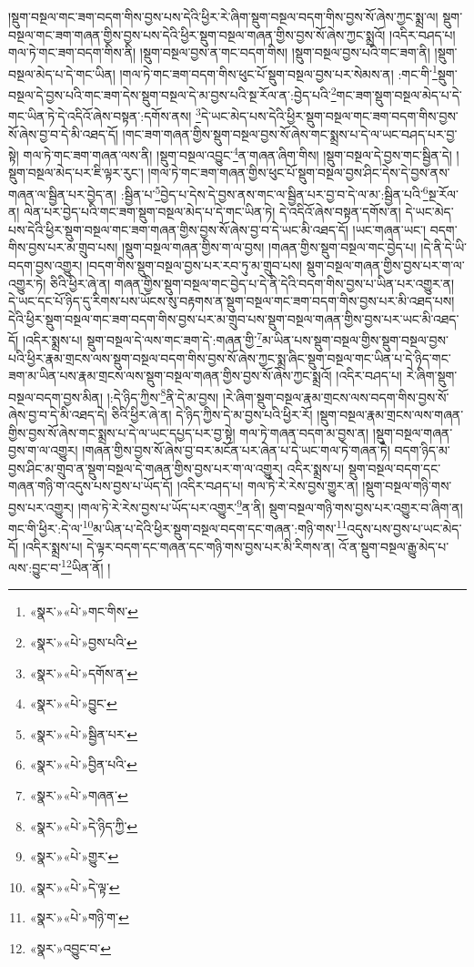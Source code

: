 །སྡུག་བསྔལ་གང་ཟག་བདག་གིས་བྱས་པས་དེའི་ཕྱིར་རེ་ཞིག་སྡུག་བསྔལ་བདག་གིས་བྱས་སོ་ཞེས་ཀྱང་སྨྲ་ལ། སྡུག་བསྔལ་གང་ཟག་གཞན་གྱིས་བྱས་པས་དེའི་ཕྱིར་སྡུག་བསྔལ་གཞན་གྱིས་བྱས་སོ་ཞེས་ཀྱང་སྨྲའོ། །འདིར་བཤད་པ། གལ་ཏེ་གང་ཟག་བདག་གིས་ནི། །སྡུག་བསྔལ་བྱས་ན་གང་བདག་གིས། །སྡུག་བསྔལ་བྱས་པའི་གང་ཟག་ནི། །སྡུག་བསྔལ་མེད་པ་དེ་གང་ཡིན། །གལ་ཏེ་གང་ཟག་བདག་གིས་ཕུང་པོ་སྡུག་བསྔལ་བྱས་པར་སེམས་ན། :གང་གི་\footnote{«སྣར་»«པེ་»གང་གིས་}སྡུག་བསྔལ་དེ་བྱས་པའི་གང་ཟག་དེས་སྡུག་བསྔལ་དེ་མ་བྱས་པའི་སྔ་རོལ་ན་:བྱེད་པའི་\footnote{«སྣར་»«པེ་»བྱས་པའི་}གང་ཟག་སྡུག་བསྔལ་མེད་པ་དེ་གང་ཡིན་ཏེ་དེ་འདིའོ་ཞེས་བསྟན་:དགོས་ནས། \footnote{«སྣར་»«པེ་»དགོས་ན་}དེ་ཡང་མེད་པས་དེའི་ཕྱིར་སྡུག་བསྔལ་གང་ཟག་བདག་གིས་བྱས་སོ་ཞེས་བྱ་བ་དེ་མི་འཐད་དོ། །གང་ཟག་གཞན་གྱིས་སྡུག་བསྔལ་བྱས་སོ་ཞེས་གང་སྨྲས་པ་དེ་ལ་ཡང་བཤད་པར་བྱ་སྟེ། གལ་ཏེ་གང་ཟག་གཞན་ལས་ནི། །སྡུག་བསྔལ་འབྱུང་\footnote{«སྣར་»«པེ་»བྱུང་}ན་གཞན་ཞིག་གིས། །སྡུག་བསྔལ་དེ་བྱས་གང་སྦྱིན་དེ། །སྡུག་བསྔལ་མེད་པར་ཇི་ལྟར་རུང་། །གལ་ཏེ་གང་ཟག་གཞན་གྱིས་ཕུང་པོ་སྡུག་བསྔལ་བྱས་ཤིང་དེས་དེ་བྱས་ནས་གཞན་ལ་སྦྱིན་པར་བྱེད་ན། :སྦྱིན་པ་\footnote{«སྣར་»«པེ་»སྦྱིན་པར་}བྱེད་པ་དེས་དེ་བྱས་ནས་གང་ལ་སྦྱིན་པར་བྱ་བ་དེ་ལ་མ་:སྦྱིན་པའི་\footnote{«སྣར་»«པེ་»བྱིན་པའི་}སྔ་རོལ་ན། ལེན་པར་བྱེད་པའི་གང་ཟག་སྡུག་བསྔལ་མེད་པ་དེ་གང་ཡིན་ཏེ། དེ་འདིའོ་ཞེས་བསྟན་དགོས་ན། དེ་ཡང་མེད་པས་དེའི་ཕྱིར་སྡུག་བསྔལ་གང་ཟག་གཞན་གྱིས་བྱས་སོ་ཞེས་བྱ་བ་དེ་ཡང་མི་འཐད་དོ། །ཡང་གཞན་ཡང་། བདག་གིས་བྱས་པར་མ་གྲུབ་པས། །སྡུག་བསྔལ་གཞན་གྱིས་ག་ལ་བྱས། །གཞན་གྱིས་སྡུག་བསྔལ་གང་བྱེད་པ། །དེ་ནི་དེ་ཡི་བདག་བྱས་འགྱུར། །བདག་གིས་སྡུག་བསྔལ་བྱས་པར་རབ་ཏུ་མ་གྲུབ་པས། སྡུག་བསྔལ་གཞན་གྱིས་བྱས་པར་ག་ལ་འགྱུར་ཏེ། ཅིའི་ཕྱིར་ཞེ་ན། གཞན་གྱིས་སྡུག་བསྔལ་གང་བྱེད་པ་དེ་ནི་དེའི་བདག་གིས་བྱས་པ་ཡིན་པར་འགྱུར་ན། དེ་ཡང་དང་པོ་ཉིད་དུ་རིགས་པས་ཡོངས་སུ་བརྟགས་ན་སྡུག་བསྔལ་གང་ཟག་བདག་གིས་བྱས་པར་མི་འཐད་པས། དེའི་ཕྱིར་སྡུག་བསྔལ་གང་ཟག་བདག་གིས་བྱས་པར་མ་གྲུབ་པས་སྡུག་བསྔལ་གཞན་གྱིས་བྱས་པར་ཡང་མི་འཐད་དོ། །འདིར་སྨྲས་པ། སྡུག་བསྔལ་དེ་ལས་གང་ཟག་དེ་:གཞན་གྱི་\footnote{«སྣར་»«པེ་»གཞན་}མ་ཡིན་པས་སྡུག་བསྔལ་གྱིས་སྡུག་བསྔལ་བྱས་པའི་ཕྱིར་རྣམ་གྲངས་ལས་སྡུག་བསྔལ་བདག་གིས་བྱས་སོ་ཞེས་ཀྱང་སྨྲ་ཞིང་སྡུག་བསྔལ་གང་ཡིན་པ་དེ་ཉིད་གང་ཟག་མ་ཡིན་པས་རྣམ་གྲངས་ལས་སྡུག་བསྔལ་གཞན་གྱིས་བྱས་སོ་ཞེས་ཀྱང་སྨྲའོ། །འདིར་བཤད་པ། རེ་ཞིག་སྡུག་བསྔལ་བདག་བྱས་མིན། །:དེ་ཉིད་ཀྱིས་\footnote{«སྣར་»«པེ་»དེ་ཉིད་ཀྱི་}ནི་དེ་མ་བྱས། །རེ་ཞིག་སྡུག་བསྔལ་རྣམ་གྲངས་ལས་བདག་གིས་བྱས་སོ་ཞེས་བྱ་བ་དེ་མི་འཐད་དེ། ཅིའི་ཕྱིར་ཞེ་ན། དེ་ཉིད་ཀྱིས་དེ་མ་བྱས་པའི་ཕྱིར་རོ། །སྡུག་བསྔལ་རྣམ་གྲངས་ལས་གཞན་གྱིས་བྱས་སོ་ཞེས་གང་སྨྲས་པ་དེ་ལ་ཡང་དཔྱད་པར་བྱ་སྟེ། གལ་ཏེ་གཞན་བདག་མ་བྱས་ན། །སྡུག་བསྔལ་གཞན་བྱས་ག་ལ་འགྱུར། །གཞན་གྱིས་བྱས་སོ་ཞེས་བྱ་བར་མངོན་པར་ཞེན་པ་དེ་ཡང་གལ་ཏེ་གཞན་ཏེ། བདག་ཉིད་མ་བྱས་ཤིང་མ་གྲུབ་ན་སྡུག་བསྔལ་དེ་གཞན་གྱིས་བྱས་པར་ག་ལ་འགྱུར། འདིར་སྨྲས་པ། སྡུག་བསྔལ་བདག་དང་གཞན་གཉི་ག་འདུས་པས་བྱས་པ་ཡོད་དོ། །འདིར་བཤད་པ། གལ་ཏེ་རེ་རེས་བྱས་གྱུར་ན། །སྡུག་བསྔལ་གཉི་གས་བྱས་པར་འགྱུར། །གལ་ཏེ་རེ་རེས་བྱས་པ་ཡོད་པར་འགྱུར་\footnote{«སྣར་»«པེ་»གྱུར་}ན་ནི། སྡུག་བསྔལ་གཉི་གས་བྱས་པར་འགྱུར་བ་ཞིག་ན། གང་གི་ཕྱིར་:དེ་ལ་\footnote{«སྣར་»«པེ་»དེ་ལྟ་}མ་ཡིན་པ་དེའི་ཕྱིར་སྡུག་བསྔལ་བདག་དང་གཞན་:གཉི་གས་\footnote{«སྣར་»«པེ་»གཉི་ག་}འདུས་པས་བྱས་པ་ཡང་མེད་དོ། །འདིར་སྨྲས་པ། དེ་ལྟར་བདག་དང་གཞན་དང་གཉི་གས་བྱས་པར་མི་རིགས་ན། འོ་ན་སྡུག་བསྔལ་རྒྱུ་མེད་པ་ལས་:བྱུང་བ་\footnote{«སྣར་»འབྱུང་བ་}ཡིན་ནོ། །
